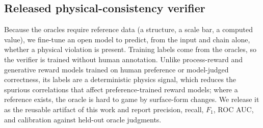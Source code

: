 \documentclass[pdflatex,sn-nature]{sn-jnl}
\begin{document}
\subsection*{Released physical-consistency verifier}
Because the oracles require reference data (a structure, a scale bar, a computed
value), we fine-tune an open model to predict, from the input and chain alone,
whether a physical violation is present. Training labels come from the oracles, so the
verifier is trained without human annotation. Unlike process-reward and generative
reward models trained on human preference or model-judged
correctness,\cite{processbench2025,compassverifier2025} its labels are a deterministic
physics signal, which reduces the spurious correlations that affect preference-trained
reward models; where a reference exists, the oracle is hard to game by surface-form changes. We release it as the reusable artifact of this work and report precision,
recall, $F_1$, ROC AUC, and calibration against held-out oracle judgments.
\end{document}
